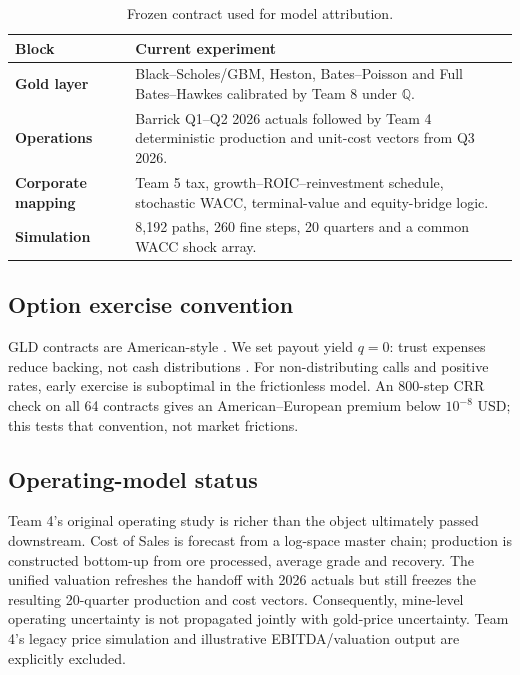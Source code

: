 \begin{table}[H]
\centering
\caption{Frozen contract used for model attribution.}
\label{tab:frozen_contract}
\begin{tabularx}{\columnwidth}{@{}>{\bfseries}p{}X@{}}
\toprule
Block & Current experiment \\
\midrule
Gold layer & Black--Scholes/GBM, Heston, Bates--Poisson and Full Bates--Hawkes calibrated by Team 8 under $\mathbb Q$. \\
Operations & Barrick Q1--Q2 2026 actuals followed by Team 4 deterministic production and unit-cost vectors from Q3 2026. \\
Corporate mapping & Team 5 tax, growth--ROIC--reinvestment schedule, stochastic WACC, terminal-value and equity-bridge logic. \\
Simulation & 8,192 paths, 260 fine steps, 20 quarters and a common WACC shock array. \\
\bottomrule
\end{tabularx}
\end{table}

\subsection{Option exercise convention}
GLD contracts are American-style \citep{cboe2026}. We set payout yield $q=0$: trust expenses reduce backing, not cash distributions \citep{spdr2025}. For non-distributing calls and positive rates, early exercise is suboptimal in the frictionless model. An 800-step CRR check on all 64 contracts gives an American--European premium below $10^{-8}$ USD; this tests that convention, not market frictions.

\subsection{Operating-model status}
Team 4's original operating study is richer than the object ultimately passed downstream. Cost of Sales is forecast from a log-space master chain; production is constructed bottom-up from ore processed, average grade and recovery. The unified valuation refreshes the handoff with 2026 actuals but still freezes the resulting 20-quarter production and cost vectors. Consequently, mine-level operating uncertainty is not propagated jointly with gold-price uncertainty. Team 4's legacy price simulation and illustrative EBITDA/valuation output are explicitly excluded.

